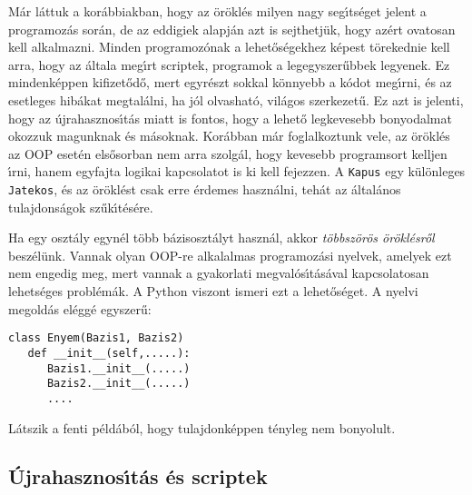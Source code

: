 M\'ar l\'attuk a kor\'abbiakban, hogy az \"or\"okl\'es milyen nagy seg\'{\i}ts\'eget jelent a programoz\'as sor\'an, de az 
eddigiek alapj\'an azt is sejthetj\"uk, hogy az\'ert ovatosan kell alkalmazni. Minden programoz\'onak a lehet\H{o}s\'egekhez 
k\'epest t\"orekednie kell arra, hogy az \'altala meg\'{\i}rt scriptek, programok a legegyszer\H{u}bbek legyenek. Ez 
mindenk\'eppen kifizet\H{o}d\H{o}, mert egyr\'eszt sokkal k\"onnyebb a k\'odot meg\'{\i}rni, \'es az esetleges hib\'akat 
megtal\'alni, ha j\'ol olvashat\'o, vil\'agos szerkezet\H{u}. Ez azt is jelenti, hogy az \'ujrahasznos\'{\i}t\'as miatt 
is fontos, hogy a lehet\H{o} legkevesebb bonyodalmat okozzuk magunknak \'es m\'asoknak. Kor\'abban m\'ar foglalkoztunk vele, 
az \"or\"okl\'es az OOP eset\'en els\H{o}sorban nem arra szolg\'al, hogy kevesebb programsort kelljen \'{\i}rni, hanem 
egyfajta logikai kapcsolatot is ki kell fejezzen. A {\tt Kapus} egy k\"ul\"onleges {\tt Jatekos}, \'es az \"or\"okl\'est 
csak erre \'erdemes haszn\'alni, teh\'at az \'altal\'anos tulajdons\'agok sz\H{u}k\'{\i}t\'es\'ere. 

Ha egy oszt\'aly egyn\'el t\"obb b\'azisoszt\'alyt haszn\'al, akkor {\sl t\"obbsz\"or\"os \"or\"okl\'esr\H{o}l} besz\'el\"unk. 
Vannak olyan OOP-re alkalalmas programoz\'asi nyelvek, amelyek ezt nem engedig meg, mert vannak a gyakorlati 
megval\'os\'{\i}t\'as\'aval kapcsolatosan lehets\'eges probl\'em\'ak. A Python viszont ismeri ezt a lehet\H{o}s\'eget. A nyelvi 
megold\'as el\'egg\'e egyszer\H{u}:

\begin{Verbatim}[fontsize=\small]
class Enyem(Bazis1, Bazis2)
   def __init__(self,.....):
      Bazis1.__init__(.....)
      Bazis2.__init__(.....)
      ....
\end{Verbatim}

L\'atszik a fenti p\'eld\'ab\'ol, hogy tulajdonk\'eppen t\'enyleg nem bonyolult.

\subsection{\'Ujrahasznos\'{\i}t\'as \'es scriptek}

